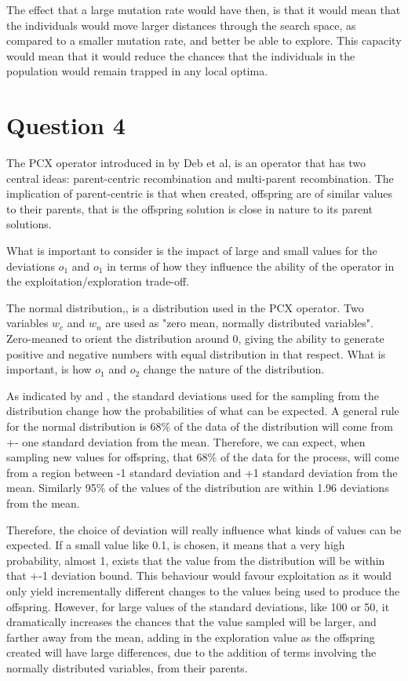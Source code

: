 \documentclass[12pt]{article}
\begin{document}
The effect that a large mutation rate would have then, is that it would mean that the individuals would move larger distances through the search space, as compared to a smaller mutation rate, and better be able to explore. This capacity would mean that it would reduce the chances that the individuals in the population would remain trapped in any local optima. 


\section{Question 4}
The PCX operator introduced in \cite{deb_anand_joshi_2002} by Deb et al, is an operator that has two central ideas: parent-centric recombination and multi-parent recombination.
The implication of parent-centric is that when created, offspring are of similar values to their parents, that is the offspring solution is close in nature to its parent solutions. 

What is important to consider is the impact of large and small values for the deviations $o_1$ and $o_1$ in terms of how they influence the ability of the operator in the exploitation/exploration trade-off.

The normal distribution,\cite{harrison_2017}, is a distribution used in the PCX operator. Two variables \cite{deb_anand_joshi_2002} $w_c$ and $w_n$ are used as "zero mean, normally distributed variables". Zero-meaned to orient the distribution around 0, giving the ability to generate positive and negative numbers with equal distribution in that respect. What is important, is how  $o_1$ and  $o_2$ change the nature of the distribution.

As indicated by  \cite{areas_under_normal_distribution} and  \cite{normal_distribution}, the standard deviations used for the sampling from the distribution change how the probabilities of what can be expected. A general rule for the normal distribution \cite{normal_distribution} is 68\% of the data of the distribution will come from +- one standard deviation from the mean. Therefore, we can expect, when sampling new values for offspring, that 68\% of the data for the process, will come from a region between -1 standard deviation and +1 standard deviation from the mean. Similarly 95\% of the values of the distribution are within 1.96 deviations from the mean.

Therefore, the choice of deviation will really influence what kinds of values can be expected. If a small value like 0.1, is chosen, it means that a very high probability, almost 1, exists that the value from the distribution will be within that +-1 deviation bound. This behaviour would favour exploitation as it would only yield incrementally different changes to the values being used to produce the offspring. However, for large values of the standard deviations, like 100 or 50, it dramatically increases the chances that the value sampled will be larger, and farther away from the mean, adding in the exploration value as the offspring created will have large differences, due to the addition of terms involving the normally distributed variables, from their parents.
\end{document}
